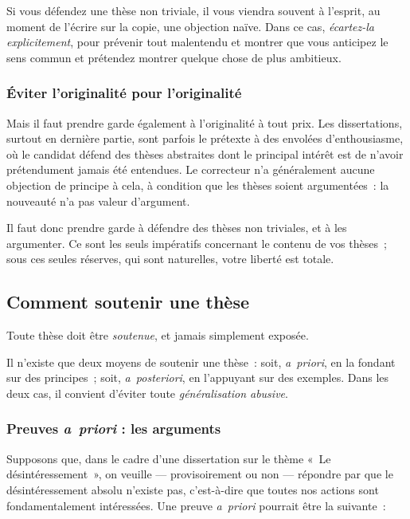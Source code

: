 \documentclass[a4paper,12pt]{article}
\begin{document}
Si vous défendez une thèse non triviale, il vous viendra souvent à
l'esprit, au moment de l'écrire sur la copie, une objection naïve. Dans
ce cas, \emph{écartez-la explicitement}, pour prévenir tout malentendu et
montrer que vous anticipez le sens commun et prétendez montrer quelque
chose de plus ambitieux.

\subsubsection{Éviter l'originalité pour l'originalité}
\label{sec-3-2-4}

Mais il faut prendre garde également à l'originalité à tout prix. Les
dissertations, surtout en dernière partie, sont parfois le prétexte à
des envolées d'enthousiasme, où le candidat défend des thèses abstraites
dont le principal intérêt est de n'avoir prétendument jamais été
entendues. Le correcteur n'a généralement aucune objection de principe à
cela, à condition que les thèses soient argumentées : la nouveauté n'a
pas valeur d'argument.

Il faut donc prendre garde à défendre des thèses non triviales, et à les
argumenter. Ce sont les seuls impératifs concernant le contenu de vos
thèses ; sous ces seules réserves, qui sont naturelles, votre liberté
est totale.

\subsection{Comment soutenir une thèse}
\label{sec-3-3}

Toute thèse doit être \emph{soutenue}, et jamais simplement exposée.

Il n'existe que deux moyens de soutenir une thèse : soit, \emph{a priori}, en
la fondant sur des principes ; soit, \emph{a posteriori}, en l'appuyant sur
des exemples. Dans les deux cas, il convient d'éviter toute
\emph{généralisation abusive}.

\subsubsection{Preuves \emph{a priori} : les arguments}
\label{sec-3-3-1}

Supposons que, dans le cadre d'une dissertation sur le thème « Le
désintéressement », on veuille --- provisoirement ou non --- répondre par
que le désintéressement absolu n'existe pas, c'est-à-dire que toutes nos
actions sont fondamentalement intéressées. Une preuve \emph{a priori}
pourrait être la suivante :
\end{document}
